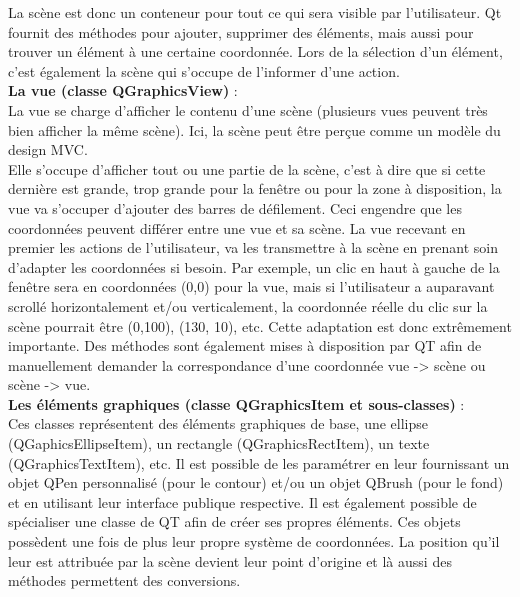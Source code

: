 \documentclass[french]{article}
\begin{document}
				La scène est donc un conteneur pour tout ce qui sera visible par l'utilisateur. Qt fournit des méthodes pour ajouter, supprimer des éléments, mais aussi pour trouver un élément à une certaine coordonnée. Lors de la sélection d'un élément, c'est également la scène qui s'occupe de l'informer d'une action. \\
				
				\textbf{La vue (classe QGraphicsView)} : \\
				La vue se charge d'afficher le contenu d'une scène (plusieurs vues peuvent très bien afficher la même scène). Ici, la scène peut être perçue comme un modèle du design MVC. \\
				Elle s'occupe d'afficher tout ou une partie de la scène, c'est à dire que si cette dernière est grande, trop grande pour la fenêtre ou pour la zone à disposition, la vue va s'occuper d'ajouter des barres de défilement. Ceci engendre que les coordonnées peuvent différer entre une vue et sa scène. La vue recevant en premier les actions de l'utilisateur, va les transmettre à la scène en prenant soin d'adapter les coordonnées si besoin. Par exemple, un clic en haut à gauche de la fenêtre sera en coordonnées (0,0) pour la vue, mais si l'utilisateur a auparavant scrollé horizontalement et/ou verticalement, la coordonnée réelle du clic sur la scène pourrait être (0,100), (130, 10), etc. Cette adaptation est donc extrêmement importante. Des méthodes sont également mises à disposition par QT afin de manuellement demander la correspondance d'une coordonnée vue -> scène ou scène -> vue. \\
				
				\textbf{Les éléments graphiques (classe QGraphicsItem et sous-classes)} : \\
				Ces classes représentent des éléments graphiques de base, une ellipse (QGaphicsEllipseItem), un rectangle (QGraphicsRectItem), un texte (QGraphicsTextItem), etc. Il est possible de les paramétrer en leur fournissant un objet QPen personnalisé (pour le contour) et/ou un objet QBrush (pour le fond) et en utilisant leur interface publique respective. Il est également possible de spécialiser une classe de QT afin de créer ses propres éléments.
				Ces objets possèdent une fois de plus leur propre système de coordonnées. La position qu'il leur est attribuée par la scène devient leur point d'origine et là aussi des méthodes permettent des conversions.
				
				\pagebreak
				
\end{document}
